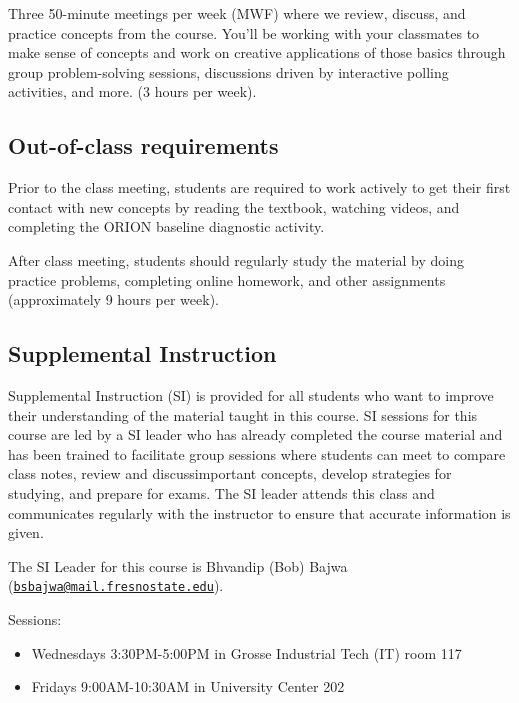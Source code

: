 Three 50-minute meetings per week (MWF) where we review, discuss, and
practice concepts from the course. You'll be working with your
classmates to make sense of concepts and work on creative applications
of those basics through group problem-solving sessions, discussions
driven by interactive polling activities, and more. (3 hours per week).

\hypertarget{out-of-class-requirements}{%
\subsection{Out-of-class requirements}\label{out-of-class-requirements}}

Prior to the class meeting, students are required to work actively to
get their first contact with new concepts by reading the textbook,
watching videos, and completing the ORION baseline diagnostic activity.

After class meeting, students should regularly study the material by
doing practice problems, completing online homework, and other
assignments (approximately 9 hours per week).

\hypertarget{supplemental-instruction}{%
\subsection{Supplemental Instruction}\label{supplemental-instruction}}

Supplemental Instruction (SI) is provided for all students who want to
improve their understanding of the material taught in this course. SI
sessions for this course are led by a SI leader who has already
completed the course material and has been trained to facilitate group
sessions where students can meet to compare class notes, review and
discussimportant concepts, develop strategies for studying, and prepare
for exams. The SI leader attends this class and communicates regularly
with the instructor to ensure that accurate information is given.

The SI Leader for this course is Bhvandip (Bob) Bajwa
(\href{mailto:bsbajwa@mail.fresnostate.edu}{\nolinkurl{bsbajwa@mail.fresnostate.edu}}).

Sessions:

\begin{itemize}
\tightlist
\item
  Wednesdays 3:30PM-5:00PM in Grosse Industrial Tech (IT) room 117
\item
  Fridays 9:00AM-10:30AM in University Center 202
\end{itemize}

